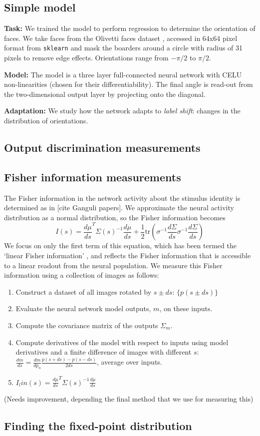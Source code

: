\documentclass[10pt, twocolumn]{article}      %
\begin{document}
\subsection{Simple model}
\textbf{Task:} We trained the model to perform regression to determine the orientation of faces.
We take faces from the Olivetti faces dataset \cite{samaria_parameterisation_1994,Olivetti}, accessed in 64x64 pixel format from \texttt{sklearn} and mask the boarders around a circle with radius of 31 pixels to remove edge effects.
Orientations range from $-\pi/2$ to $\pi/2$.

\noindent \textbf{Model:} The model is a three layer full-connected neural network with CELU non-linearities \cite{barron_continuously_2017} (chosen for their differentiability). The final angle is read-out from the two-dimensional output layer by projecting onto the diagonal. 

\noindent \textbf{Adaptation:} We study how the network adapts to \textit{label shift}: changes in the distribution of orientations.


\subsection{Output discrimination measurements}

\subsection{Fisher information measurements}
The Fisher information in the network activity about the stimulus identity is determined as in [cite Ganguli papers]. We approximate the neural activity distribution as a normal distribution, so the Fisher information becomes
\begin{equation}
  I(s) = \frac{d \mu}{ds}^T \Sigma(s)^{-1} \frac{d\mu}{ds} + \frac{1}{2} \textrm{tr}( \sigma^{-1} \frac{d \Sigma}{ds}\sigma^{-1} \frac{d \Sigma}{ds})
\end{equation}
We focus on only the first term of this equation, which has been termed the `linear Fisher information' \cite{kanitscheider_measuring_2015}, and reflects the Fisher information that is accessible to a linear readout from the neural population.
We measure this Fisher information using a collection of images as follows:
\begin{enumerate}
  \item Construct a dataset of all images rotated by $s \pm ds$: $\{p(s \pm ds)\}$
  \item Evaluate the neural network model outputs, $m$, on these inputs. 
  \item Compute the covariance matrix of the outputs $\Sigma_m$.
  \item Compute derivatives of the model with respect to inputs using model derivatives and a finite difference of images with different $s$: $\frac{dm}{ds} = \frac{dm}{d p_n} \frac{p(s + ds) - p(s - ds)}{2 ds} $, average over inputs.
  \item $I_lin(s) = \frac{d \mu}{ds}^T \Sigma(s)^{-1} \frac{d\mu}{ds}$
\end{enumerate}
(Needs improvement, depending the final method that we use for measuring this)

\subsection{Finding the fixed-point distribution}




\end{document}
